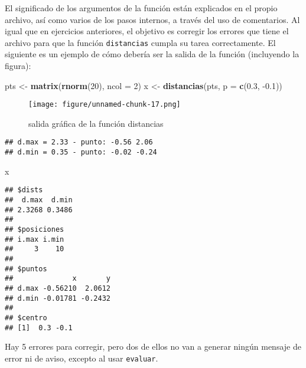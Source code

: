 \documentclass[]{article}
\makeatletter
\newenvironment{Shaded}{}{}
\newcommand{\KeywordTok}[1]{\textcolor[rgb]{0.00,0.44,0.13}{\textbf{{#1}}}}
\newcommand{\DataTypeTok}[1]{\textcolor[rgb]{0.56,0.13,0.00}{{#1}}}
\newcommand{\DecValTok}[1]{\textcolor[rgb]{0.25,0.63,0.44}{{#1}}}
\newcommand{\FloatTok}[1]{\textcolor[rgb]{0.25,0.63,0.44}{{#1}}}
\newcommand{\StringTok}[1]{\textcolor[rgb]{0.25,0.44,0.63}{{#1}}}
\newcommand{\NormalTok}[1]{{#1}}
\def\maxwidth{\ifdim\Gin@nat@width>\linewidth\linewidth
\else\Gin@nat@width\fi}
\let\Oldincludegraphics\includegraphics
\renewcommand{\includegraphics}[1]{\Oldincludegraphics[width=\maxwidth]{#1}}
\makeatother
\begin{document}
El significado de los argumentos de la función están explicados en el
propio archivo, así como varios de los pasos internos, a través del uso
de comentarios. Al igual que en ejercicios anteriores, el objetivo es
corregir los errores que tiene el archivo para que la función
\texttt{distancias} cumpla su tarea correctamente. El siguiente es un
ejemplo de cómo debería ser la salida de la función (incluyendo la
figura):

\begin{Shaded}
\begin{Highlighting}[]
\NormalTok{pts <-}\StringTok{ }\KeywordTok{matrix}\NormalTok{(}\KeywordTok{rnorm}\NormalTok{(}\DecValTok{20}\NormalTok{), }\DataTypeTok{ncol =} \DecValTok{2}\NormalTok{)}
\NormalTok{x <-}\StringTok{ }\KeywordTok{distancias}\NormalTok{(pts, }\DataTypeTok{p =} \KeywordTok{c}\NormalTok{(}\FloatTok{0.3}\NormalTok{, -}\FloatTok{0.1}\NormalTok{))}
\end{Highlighting}
\end{Shaded}

\begin{figure}[htbp]
\centering
\texttt{[image: figure/unnamed-chunk-17.png]}
\caption{salida gráfica de la función distancias}
\end{figure}

\begin{verbatim}
## d.max = 2.33 - punto: -0.56 2.06 
## d.min = 0.35 - punto: -0.02 -0.24
\end{verbatim}

\begin{Shaded}
\begin{Highlighting}[]
\NormalTok{x}
\end{Highlighting}
\end{Shaded}

\begin{verbatim}
## $dists
##  d.max  d.min 
## 2.3268 0.3486 
## 
## $posiciones
## i.max i.min 
##     3    10 
## 
## $puntos
##              x       y
## d.max -0.56210  2.0612
## d.min -0.01781 -0.2432
## 
## $centro
## [1]  0.3 -0.1
\end{verbatim}

Hay 5 errores para corregir, pero dos de ellos no van a generar ningún
mensaje de error ni de aviso, excepto al usar \texttt{evaluar}.
\end{document}
